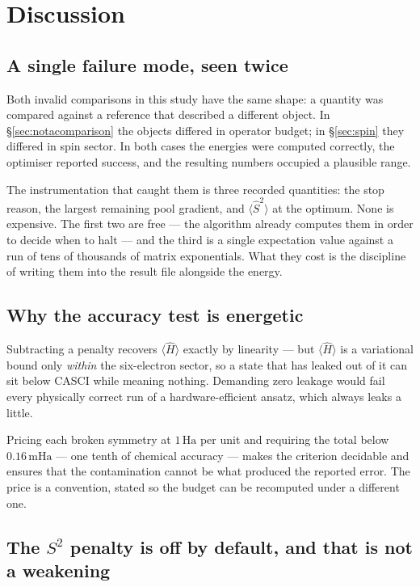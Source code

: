 \documentclass[11pt,a4paper]{article}
\newcommand{\mHa}{\ensuremath{\,\mathrm{mHa}}}
\newcommand{\Ha}{\ensuremath{\,\mathrm{Ha}}}
\newcommand{\Ssq}{\ensuremath{\langle \hat{S}^2 \rangle}}
\begin{document}
\section{Discussion}

\subsection{A single failure mode, seen twice}

Both invalid comparisons in this study have the same shape: a quantity was
compared against a reference that described a different object. In
\S\ref{sec:notacomparison} the objects differed in operator budget; in
\S\ref{sec:spin} they differed in spin sector. In both cases the energies were
computed correctly, the optimiser reported success, and the resulting numbers
occupied a plausible range.

The instrumentation that caught them is three recorded quantities: the stop
reason, the largest remaining pool gradient, and $\Ssq$ at the optimum. None is
expensive. The first two are free --- the algorithm already computes them in
order to decide when to halt --- and the third is a single expectation value
against a run of tens of thousands of matrix exponentials. What they cost is
the discipline of writing them into the result file alongside the energy.

\subsection{Why the accuracy test is energetic}

Subtracting a penalty recovers $\langle \hat H \rangle$ exactly by linearity ---
but $\langle \hat H \rangle$ is a variational bound only \emph{within} the
six-electron sector, so a state that has leaked out of it can sit below CASCI
while meaning nothing. Demanding zero leakage would fail every physically
correct run of a hardware-efficient ansatz, which always leaks a little.

Pricing each broken symmetry at $1\Ha$ per unit and requiring the total below
$0.16\mHa$ --- one tenth of chemical accuracy --- makes the criterion decidable
and ensures that the contamination cannot be what produced the reported error.
The price is a convention, stated so the budget can be recomputed under a
different one.

\subsection{The $S^2$ penalty is off by default, and that is not a weakening}
\end{document}
